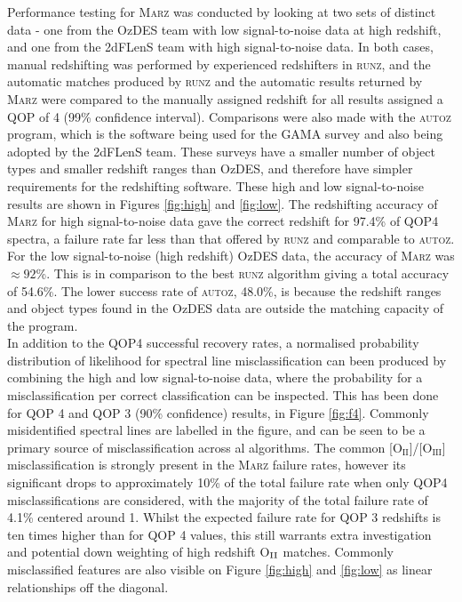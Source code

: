 \documentclass[iop]{emulateapj}
\newcommand{\runz}{\textsc{runz}}
\newcommand{\autoz}{\textsc{autoz}}
\newcommand{\marz}{\textsc{Marz}}
\begin{document}
Performance testing for \marz{} was conducted by looking at two sets of distinct data - one from the OzDES team with low signal-to-noise data at high redshift, and one from the 2dFLenS team with high signal-to-noise data. In both cases, manual redshifting was performed by experienced redshifters in \runz{}, and the automatic matches produced by \runz{} and the automatic results returned by \marz{} were compared to the manually assigned redshift for all results assigned a QOP of 4 (99\% confidence interval). Comparisons were also made with the \autoz{} program, which is the software being used for the GAMA survey and also being adopted by the 2dFLenS team. These surveys have a smaller number of object types and smaller redshift ranges than OzDES, and therefore have simpler requirements for the redshifting software. These high and low signal-to-noise results are shown in Figures \ref{fig:high} and \ref{fig:low}. The redshifting accuracy of \marz{} for high signal-to-noise data gave the correct redshift for 97.4\% of QOP4 spectra, a failure rate far less than that offered by \runz{} and comparable to \autoz{}. For the low signal-to-noise (high redshift) OzDES data, the accuracy of \marz{} was $\approx 92$\%. This is in comparison to the best \runz{} algorithm giving a total accuracy of 54.6\%. The lower success rate of \autoz, 48.0\%, is because the redshift ranges and object types found in the OzDES data are outside the matching capacity of the program.\\

In addition to the QOP4 successful recovery rates, a normalised probability distribution of likelihood for spectral line misclassification can been produced by combining the high and low signal-to-noise data, where the probability for a misclassification per correct classification can be inspected. This has been done for QOP 4 and QOP 3 (90\% confidence) results, in Figure \ref{fig:f4}. Commonly misidentified spectral lines are labelled in the figure, and can be seen to be a primary source of misclassification across al algorithms. The common [O$_{\mathrm{II}}$]/[O$_{\mathrm{III}}$] misclassification is strongly present in the \marz{} failure rates, however its significant drops to approximately 10\% of the total failure rate when only QOP4 misclassifications are considered, with the majority of the total failure rate of 4.1\% centered around 1. Whilst the expected failure rate for QOP 3 redshifts is ten times higher than for QOP 4 values, this still warrants extra investigation and potential down weighting of high redshift O$_{\rm{II}}$ matches. Commonly misclassified features are also visible on Figure \ref{fig:high} and \ref{fig:low} as linear relationships off the diagonal.\\
\end{document}
